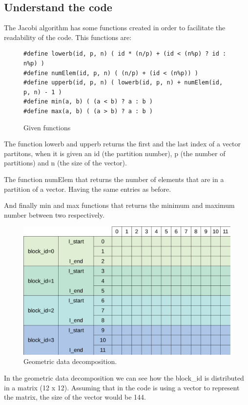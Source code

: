 \documentclass[12pt, a4paper]{article}
\begin{document}
\subsection{Understand the code}
The Jacobi algorithm has some functions created in order to facilitate the readability of the code. This functions are:

\begin{figure}[H]
\begin{lstlisting}
#define lowerb(id, p, n) ( id * (n/p) + (id < (n%p) ? id : n%p) )
#define numElem(id, p, n) ( (n/p) + (id < (n%p)) )
#define upperb(id, p, n) ( lowerb(id, p, n) + numElem(id, p, n) - 1 )
#define min(a, b) ( (a < b) ? a : b )
#define max(a, b) ( (a > b) ? a : b )
\end{lstlisting}
\caption{Given functions}
\end{figure}

The function lowerb and upperb returns the first and the last index of a vector partitons, when it is given an id (the partition number), p (the number of partitions) and n (the size of the vector).

The function numElem that returns the number of elements that are in a partition of a vector. Having the same entries as before.

And finally min and max functions that returns the minimum and maximum number between two respectively.

\begin{figure}[H]
	\centering
	\includegraphics[scale=0.30]{./images/data_decomposition.png}
	\caption{Geometric data decomposition.}
\end{figure}

In the geometric data decomposition we can see how the block\_id is distributed in a matrix (12 x 12). Assuming that in the code is using a vector to represent the matrix, the size of the vector would be 144.
\end{document}
